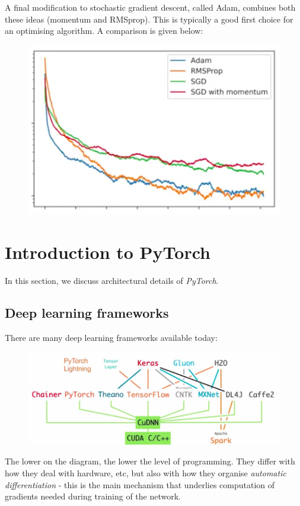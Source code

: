 A final modification to stochastic gradient descent, called Adam, combines both these ideas (momentum and RMSprop). This is typically a good first choice for an optimising algorithm. A comparison is given below:
\begin{figure}[H]
\centering
\includegraphics[scale=0.4]{sgdcomparison.png}
\end{figure}








\newpage
\section{Introduction to PyTorch}
In this section, we discuss architectural details of \textit{PyTorch}. 

\subsection{Deep learning frameworks}
There are many deep learning frameworks available today:
\begin{figure}[H]
\centering
\includegraphics[scale=0.4]{deeplearningframeworks.png}
\end{figure}
The lower on the diagram, the lower the level of programming. They differ with how they deal with hardware, etc, but also with how they organise \textit{automatic differentiation} - this is the main mechanism that underlies computation of gradients needed during training of the network.\\

